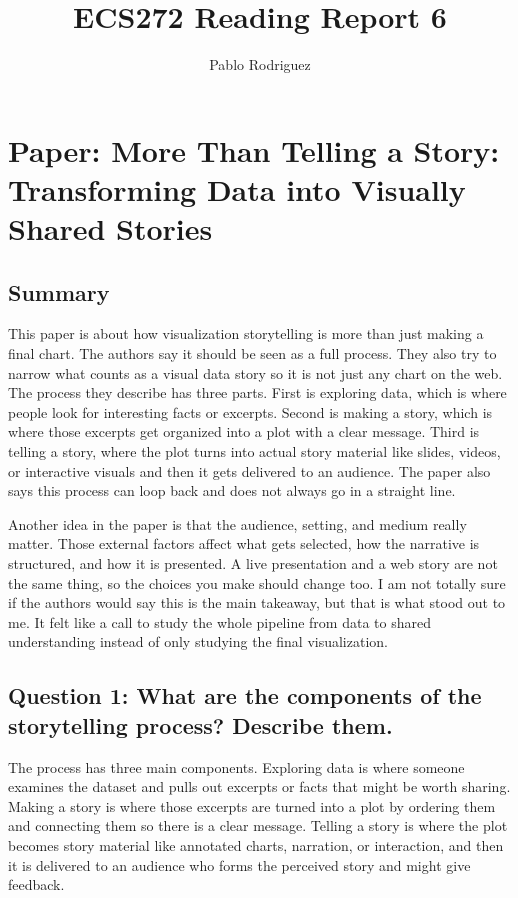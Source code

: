 \documentclass[11pt]{article}
\title{ECS272 Reading Report 6}
\author{Pablo Rodriguez}
\date{}
\begin{document}
\maketitle

\section*{Paper: More Than Telling a Story: Transforming Data into Visually Shared Stories}

\subsection*{Summary}

This paper is about how visualization storytelling is more than just making a final chart. The authors say it should be seen as a full process. They also try to narrow what counts as a visual data story so it is not just any chart on the web. The process they describe has three parts. First is exploring data, which is where people look for interesting facts or excerpts. Second is making a story, which is where those excerpts get organized into a plot with a clear message. Third is telling a story, where the plot turns into actual story material like slides, videos, or interactive visuals and then it gets delivered to an audience. The paper also says this process can loop back and does not always go in a straight line. 

Another idea in the paper is that the audience, setting, and medium really matter. Those external factors affect what gets selected, how the narrative is structured, and how it is presented. A live presentation and a web story are not the same thing, so the choices you make should change too. I am not totally sure if the authors would say this is the main takeaway, but that is what stood out to me. It felt like a call to study the whole pipeline from data to shared understanding instead of only studying the final visualization.

\subsection*{Question 1: What are the components of the storytelling process? Describe them.}

The process has three main components. Exploring data is where someone examines the dataset and pulls out excerpts or facts that might be worth sharing. Making a story is where those excerpts are turned into a plot by ordering them and connecting them so there is a clear message. Telling a story is where the plot becomes story material like annotated charts, narration, or interaction, and then it is delivered to an audience who forms the perceived story and might give feedback.
\end{document}
